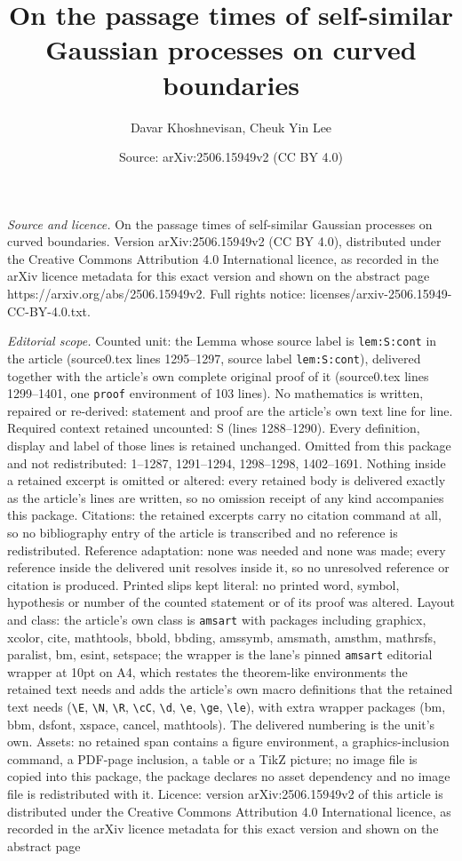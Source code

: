 \documentclass[10pt,a4paper]{amsart}
\title[On the passage times of self-similar Gaussian processes on c]{On the passage times of self-similar Gaussian processes on curved boundaries}
\author{Davar Khoshnevisan, Cheuk Yin Lee}
\date{Source: arXiv:2506.15949v2 (CC BY 4.0)}
\begin{document}
\maketitle

\noindent\emph{Source and licence.} On the passage times of self-similar Gaussian processes on curved boundaries. Version arXiv:2506.15949v2 (CC BY 4.0), distributed under the Creative Commons Attribution 4.0 International licence, as recorded in the arXiv licence metadata for this exact version and shown on the abstract page https://arxiv.org/abs/2506.15949v2. Full rights notice: licenses/arxiv-2506.15949-CC-BY-4.0.txt.\par\smallskip

\noindent\textit{Editorial scope.} Counted unit: the Lemma whose source label is \texttt{lem:S:cont} in the article (source0.tex lines 1295--1297, source label \texttt{lem:S:cont}), delivered together with the article's own complete original proof of it (source0.tex lines 1299--1401, one \texttt{proof} environment of 103 lines). No mathematics is written, repaired or re-derived: statement and proof are the article's own text line for line. Required context retained uncounted: S (lines 1288--1290). Every definition, display and label of those lines is retained unchanged. Omitted from this package and not redistributed: 1--1287, 1291--1294, 1298--1298, 1402--1691. Nothing inside a retained excerpt is omitted or altered: every retained body is delivered exactly as the article's lines are written, so no omission receipt of any kind accompanies this package. Citations: the retained excerpts carry no citation command at all, so no bibliography entry of the article is transcribed and no reference is redistributed. Reference adaptation: none was needed and none was made; every reference inside the delivered unit resolves inside it, so no unresolved reference or citation is produced. Printed slips kept literal: no printed word, symbol, hypothesis or number of the counted statement or of its proof was altered. Layout and class: the article's own class is \texttt{amsart} with packages including graphicx, xcolor, cite, mathtools, bbold, bbding, amssymb, amsmath, amsthm, mathrsfs, paralist, bm, esint, setspace; the wrapper is the lane's pinned \texttt{amsart} editorial wrapper at 10pt on A4, which restates the theorem-like environments the retained text needs and adds the article's own macro definitions that the retained text needs (\texttt{\textbackslash E}, \texttt{\textbackslash N}, \texttt{\textbackslash R}, \texttt{\textbackslash cC}, \texttt{\textbackslash d}, \texttt{\textbackslash e}, \texttt{\textbackslash ge}, \texttt{\textbackslash le}), with extra wrapper packages (bm, bbm, dsfont, xspace, cancel, mathtools). The delivered numbering is the unit's own. Assets: no retained span contains a figure environment, a graphics-inclusion command, a PDF-page inclusion, a table or a TikZ picture; no image file is copied into this package, the package declares no asset dependency and no image file is redistributed with it. Licence: version arXiv:2506.15949v2 of this article is distributed under the Creative Commons Attribution 4.0 International licence, as recorded in the arXiv licence metadata for this exact version and shown on the abstract page 
\end{document}
